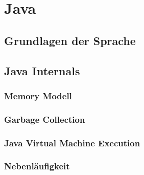 \documentclass[../main.tex]{subfiles}
\begin{document}
	
	\section{Java}
	\subsection{Grundlagen der Sprache}
	
	\subsection{Java Internals}
	\subsubsection{Memory Modell}
	\clearpage
	
	\subsubsection{Garbage Collection}
	\clearpage
	
	\subsubsection{Java Virtual Machine Execution}
	\clearpage
	
	\subsubsection{Nebenläufigkeit}
	\clearpage
	
\end{document}
